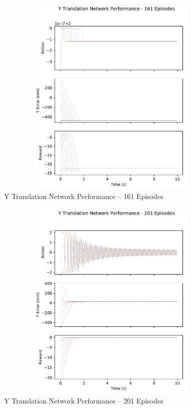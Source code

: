 \begin{figure}[H]
	\centering
	\includegraphics[width=6in, height=3.85in, keepaspectratio]{figures/train_figs/transy_transitions/2_161.pdf}
	\caption{Y Translation Network Performance -- 161 Episodes}
\end{figure}
\begin{figure}[H]
	\centering
	\includegraphics[width=6in, height=3.85in, keepaspectratio]{figures/train_figs/transy_transitions/2_201.pdf}
	\caption{Y Translation Network Performance -- 201 Episodes}
\end{figure}
